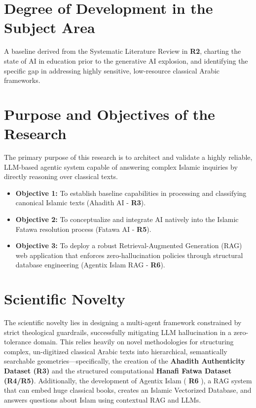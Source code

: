 \documentclass[12pt, a4paper]{report}
\begin{document}
\section{Degree of Development in the Subject Area}
A baseline derived from the Systematic Literature Review in \textbf{R2}, charting the state of AI in education prior to the generative AI explosion, and identifying the specific gap in addressing highly sensitive, low-resource classical Arabic frameworks.

\section{Purpose and Objectives of the Research}
The primary purpose of this research is to architect and validate a highly reliable, LLM-based agentic system capable of answering complex Islamic inquiries by directly reasoning over classical texts. 
\begin{itemize}
    \item \textbf{Objective 1:} To establish baseline capabilities in processing and classifying canonical Islamic texts (Ahadith AI - \textbf{R3}).
    \item \textbf{Objective 2:} To conceptualize and integrate AI natively into the Islamic Fatawa resolution process (Fatawa AI - \textbf{R5}).
    \item \textbf{Objective 3:} To deploy a robust Retrieval-Augmented Generation (RAG) web application that enforces zero-hallucination policies through structural database engineering (Agentix Islam RAG - \textbf{R6}).
\end{itemize}

\section{Scientific Novelty}
The scientific novelty lies in designing a multi-agent framework constrained by strict theological guardrails, successfully mitigating LLM hallucination in a zero-tolerance domain. This relies heavily on novel methodologies for structuring complex, un-digitized classical Arabic texts into hierarchical, semantically searchable geometries—specifically, the creation of the \textbf{Ahadith Authenticity Dataset (R3)} and the structured computational \textbf{Hanafi Fatwa Dataset (R4/R5)}. Additionally, the development of Agentix Islam ( \textbf{R6} ), a RAG system that can embed huge classical books, creates an Islamic Vectorized Database, and answers questions about Islam using contextual RAG and LLMs.
\end{document}
